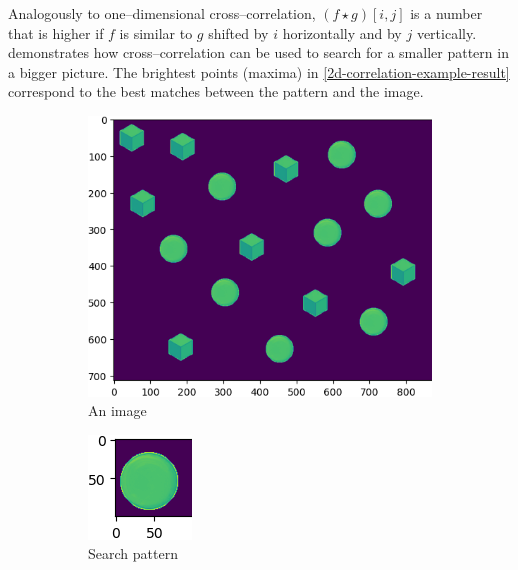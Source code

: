 Analogously to one--dimensional cross--correlation, $(f \star g)[i,j]$ is a number that is higher if $f$ is similar to $g$ shifted by $i$ horizontally and by $j$ vertically.  demonstrates how cross--correlation can be used to search for a smaller pattern in a bigger picture. The brightest points (maxima) in \cref{2d-correlation-example-result} correspond to the best matches between the pattern and the image.

\begin{figure}
	\centering
		\begin{subfigure}{.49\textwidth}
		\centering
		\includegraphics[width=\linewidth]{img/shapes}
		\caption{An image}
	\end{subfigure}
	\begin{subfigure}{.49\textwidth}
	\centering
	\includegraphics[width=0.4\linewidth]{img/shapes_pattern}
	\caption{Search pattern}
	\end{subfigure}
	\begin{subfigure}{.5\textwidth}

\end{subfigure}
\end{figure}
